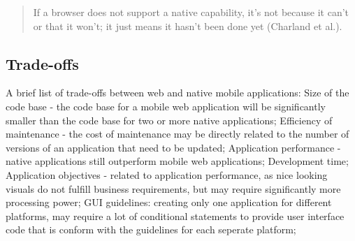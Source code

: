\begin{quotation}
	If a browser does not support a native capability, it's not because it can't or that it won't; it just means it hasn't been done yet (Charland et al.).
\end{quotation}


\subsection{Trade-offs}

A brief list of trade-offs between web and native mobile applications:
Size of the code base - the code base for a mobile web application will be significantly smaller than the code base for two or more native applications;
Efficiency of maintenance - the cost of maintenance may be directly related to the number of versions of an application that need to be updated;
Application performance - native applications still outperform mobile web applications;
Development time;
Application objectives - related to application performance, as nice looking visuals do not fulfill business requirements, but may require significantly more processing power;
GUI guidelines: creating only one application for different platforms, may require a lot of conditional statements to provide user interface code that is conform with the guidelines for each seperate platform;
